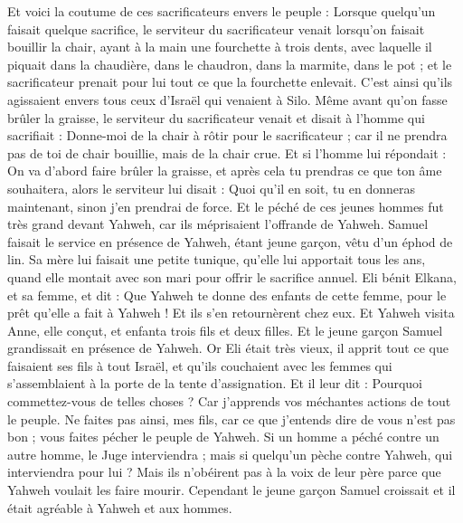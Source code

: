 \begin{multicols}{2}
Et voici la coutume de ces sacrificateurs envers le peuple : Lorsque quelqu'un faisait quelque sacrifice, le serviteur du sacrificateur venait lorsqu'on faisait bouillir la chair, ayant à la main une fourchette à trois dents,
avec laquelle il piquait dans la chaudière, dans le chaudron, dans la marmite, dans le pot ; et le sacrificateur prenait pour lui tout ce que la fourchette enlevait. C'est ainsi qu'ils agissaient envers tous ceux d'Israël qui venaient à Silo.
Même avant qu'on fasse brûler la graisse, le serviteur du sacrificateur venait et disait à l'homme qui sacrifiait : Donne-moi de la chair à rôtir pour le sacrificateur ; car il ne prendra pas de toi de chair bouillie, mais de la chair crue.
Et si l'homme lui répondait : On va d'abord faire brûler la graisse, et après cela tu prendras ce que ton âme souhaitera, alors le serviteur lui disait : Quoi qu'il en soit, tu en donneras maintenant, sinon j'en prendrai de force.
Et le péché de ces jeunes hommes fut très grand devant Yahweh, car ils méprisaient l'offrande de Yahweh.
Samuel faisait le service en présence de Yahweh, étant jeune garçon, vêtu d'un éphod de lin.
Sa mère lui faisait une petite tunique, qu'elle lui apportait tous les ans, quand elle montait avec son mari pour offrir le sacrifice annuel.
Eli bénit Elkana, et sa femme, et dit : Que Yahweh te donne des enfants de cette femme, pour le prêt qu'elle a fait à Yahweh ! Et ils s'en retournèrent chez eux.
Et Yahweh visita Anne, elle conçut, et enfanta trois fils et deux filles. Et le jeune garçon Samuel grandissait en présence de Yahweh.
Or Eli était très vieux, il apprit tout ce que faisaient ses fils à tout Israël, et qu'ils couchaient avec les femmes qui s’assemblaient à la porte de la tente d'assignation.
Et il leur dit : Pourquoi commettez-vous de telles choses ? Car j'apprends vos méchantes actions de tout le peuple.
Ne faites pas ainsi, mes fils, car ce que j'entends dire de vous n'est pas bon ; vous faites pécher le peuple de Yahweh.
Si un homme a péché contre un autre homme, le Juge interviendra ; mais si quelqu'un pèche contre Yahweh, qui interviendra pour lui ? Mais ils n'obéirent pas à la voix de leur père parce que Yahweh voulait les faire mourir.
Cependant le jeune garçon Samuel croissait et il était agréable à Yahweh et aux hommes.

\end{multicols}
